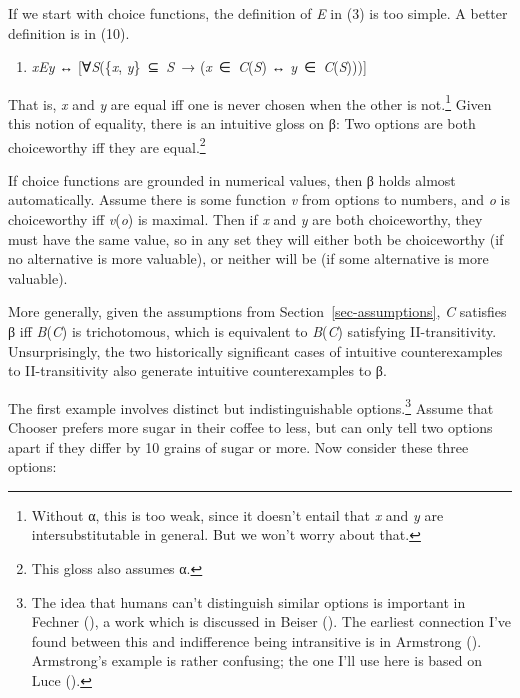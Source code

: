 \documentclass[
  11pt,
  letterpaper,
  DIV=11,
  numbers=noendperiod,
  twoside]{scrartcl}
\providecommand{\tightlist}{%
  \setlength{\itemsep}{0pt}\setlength{\parskip}{0pt}}
\begin{document}
If we start with choice functions, the definition of \emph{E} in (3) is
too simple. A better definition is in (10).

\begin{enumerate}
\def\labelenumi{(\arabic{enumi})}
\setcounter{enumi}{9}
\tightlist
\item
  \emph{xEy} ↔ {[}∀\emph{S}(\{\emph{x}, \emph{y}\}~⊆~\emph{S}~→
  (\emph{x}~∈~\emph{C}(\emph{S}) ↔ \emph{y}~∈~\emph{C}(\emph{S}))){]}
\end{enumerate}

That is, \emph{x} and \emph{y} are equal iff one is never chosen when
the other is not.\footnote{Without α, this is too weak, since it doesn't
  entail that \emph{x} and \emph{y} are intersubstitutable in general.
  But we won't worry about that.} Given this notion of equality, there
is an intuitive gloss on β: Two options are both choiceworthy iff they
are equal.\footnote{This gloss also assumes α.}

If choice functions are grounded in numerical values, then β holds
almost automatically. Assume there is some function \emph{v} from
options to numbers, and \emph{o} is choiceworthy iff \emph{v}(\emph{o})
is maximal. Then if \emph{x} and \emph{y} are both choiceworthy, they
must have the same value, so in any set they will either both be
choiceworthy (if no alternative is more valuable), or neither will be
(if some alternative is more valuable).

More generally, given the assumptions from
Section~\ref{sec-assumptions}, \emph{C} satisfies β iff
\emph{B}(\emph{C}) is trichotomous, which is equivalent to
\emph{B}(\emph{C}) satisfying II-transitivity. Unsurprisingly, the two
historically significant cases of intuitive counterexamples to
II-transitivity also generate intuitive counterexamples to β.

The first example involves distinct but indistinguishable
options.\footnote{The idea that humans can't distinguish similar options
  is important in Fechner (), a work
  which is discussed in Beiser (). The
  earliest connection I've found between this and indifference being
  intransitive is in Armstrong ().
  Armstrong's example is rather confusing; the one I'll use here is
  based on Luce ().} Assume that Chooser
prefers more sugar in their coffee to less, but can only tell two
options apart if they differ by 10 grains of sugar or more. Now consider
these three options:
\end{document}
